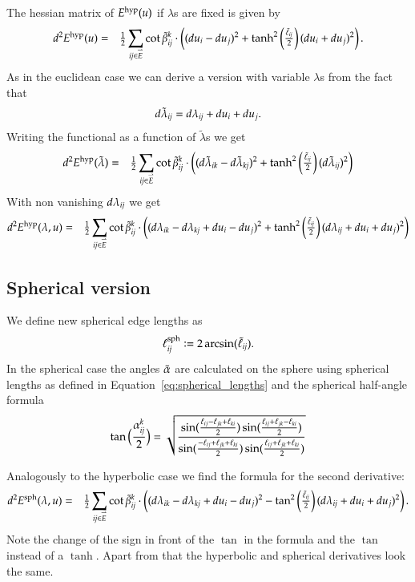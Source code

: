 \documentclass[Thesis]{subfiles}
\begin{document}
The hessian matrix of $E^{\rm hyp}(u)$ if $\lambda$s are fixed is given by
\begin{eqnarray*}
d^2E^{\rm hyp}(u)
&=&\tfrac{1}{2}\sum_{\it ij\in \accentset{\rightharpoonup}{E}} \cot\tilde{\beta}^k_{\it ij} \cdot \left((du_i-du_j)^2+
\tanh^2\left(\tfrac{\tilde \ell_{\it ij}}{2}\right)(du_i+du_j)^2\right).
\end{eqnarray*}
 As in the euclidean case we can derive a version with variable $\lambda$s from the fact that 
\begin{equation*}
d\tilde \lambda_{\it ij}=d\lambda_{\it ij}+du_i+du_j.
\end{equation*}
Writing the functional as a function of $\tilde \lambda$s we get 
\begin{eqnarray*}
 d^2E^{\rm hyp}(\tilde \lambda) &=&
 \tfrac{1}{2}\sum_{\it ij\in \accentset{\rightharpoonup}{E}} \cot\tilde{\beta}^k_{\it ij} \cdot \left((d\tilde\lambda_{\it ik}-d\tilde\lambda_{\it kj})^2+\tanh^2\left(\tfrac{\tilde \ell_{\it ij}}{2}\right)(d\tilde\lambda_{\it ij})^2\right)
\end{eqnarray*}
With non vanishing $d\lambda_{\it ij}$ we get
\begin{eqnarray*}
d^2E^{\rm hyp}(\lambda, u)
&=& \tfrac{1}{2}\sum_{\it ij\in \accentset{\rightharpoonup}{E}} \cot\tilde{\beta}^k_{\it ij} \cdot 
 \left((d\lambda_{\it ik}-d\lambda_{\it kj} +  du_i-du_j)^2+\tanh^2\left(\tfrac{\tilde \ell_{\it ij}}{2}\right)(d\lambda_{\it ij} +du_i+du_j)^2\right)
\end{eqnarray*}

\subsection{Spherical version}
\label{sec:spherical_fuctional}
We define new spherical edge lengths as 
\begin{equation}
\ell^{\rm sph}_{\it ij} \vcentcolon= 2\arcsin(\tilde \ell_{\it ij}).\label{eq:spherical_lengths}
\end{equation}
In the spherical case the angles $\tilde{\alpha}$ are calculated on the sphere using spherical lengths as defined in 
Equation~\ref{eq:spherical_lengths} and the spherical half-angle formula
\[
  \tan\Big(\frac{\alpha^k_{\it ij}}{2}\Big)=
  \sqrt{\frac{
      \sin(\frac{\ell_{ij}-\ell_{jk}+\ell_{ki}}{2})
      \sin(\frac{\ell_{ij}+\ell_{jk}-\ell_{ki}}{2})
    }{
      \sin(\frac{-\ell_{ij}+\ell_{jk}+\ell_{ki}}{2})
      \sin(\frac{\ell_{ij}+\ell_{jk}+\ell_{ki}}{2})
    }}
\]

Analogously to the hyperbolic case we find the formula for the second derivative:
\begin{eqnarray*}
d^2E^{\rm sph}(\lambda, u)
&=& \tfrac{1}{2}\sum_{\it ij\in \accentset{\rightharpoonup}{E}} \cot\tilde{\beta}^k_{\it ij} \cdot 
 \left((d\lambda_{\it ik}-d\lambda_{\it kj} +  du_i-du_j)^2-\tan^2\left(\tfrac{\tilde \ell_{\it ij}}{2}\right)(d\lambda_{\it ij} +du_i+du_j)^2\right).
\end{eqnarray*}
Note the change of the sign in front of the $\tan$ in the formula and the $\tan$ instead of a $\tanh$. 
Apart from that the hyperbolic and spherical derivatives look the same.
\end{document}
